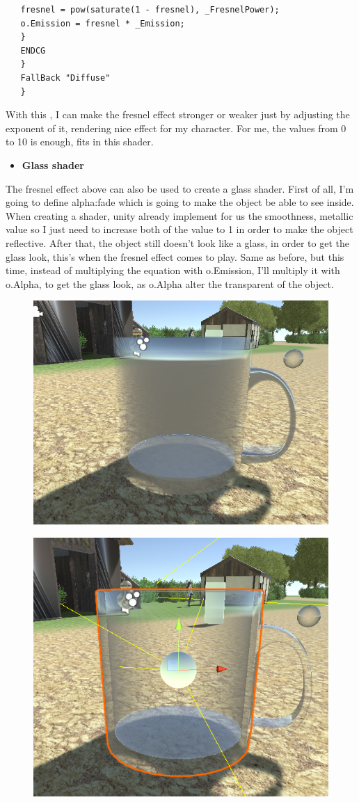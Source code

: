 \documentclass[a4paper, 13pt]{extarticle}
\begin{document}
{\begin{lstlisting}
   fresnel = pow(saturate(1 - fresnel), _FresnelPower);
   o.Emission = fresnel * _Emission;
   }
   ENDCG							  
   } 
   FallBack "Diffuse"
   }
   \end{lstlisting}
  With this , I can make the fresnel effect stronger or weaker just by adjusting the exponent of it, rendering nice effect for my character. For me, the values from 0 to 10 is enough, fits in this shader.
   \begin{itemize}
  	\item \bfseries Glass shader
  \end{itemize}  
  	The fresnel effect above can also be used to create a glass shader. First of all, I'm going to define alpha:fade which is going to make the object be able to see inside. When creating a shader, unity already implement for us the smoothness, metallic value so I just need to increase both of the value to 1 in order to make the object reflective. After that, the object still doesn't look like a glass, in order to get the glass look, this's when the fresnel effect comes to play. Same as before, but this time, instead of multiplying the equation with o.Emission, I'll multiply it with o.Alpha, to get the glass look, as o.Alpha alter the transparent of the object.
  	\begin{figure}[h]
  		\begin{minipage}{.5\textwidth}
  			\centering
  			\includegraphics[width=0.7\linewidth]{intructions/whole_surface.png}
  			\centering
  			\label{fig:test30}
  		\end{minipage}
  		\begin{minipage}{.5\textwidth}
  			\centering
  			\includegraphics[width=0.6\linewidth]{intructions/from_edge.png}
  			\centering
  			\label{fig:test31}
  		\end{minipage}
  		

\end{figure}}
\end{document}

